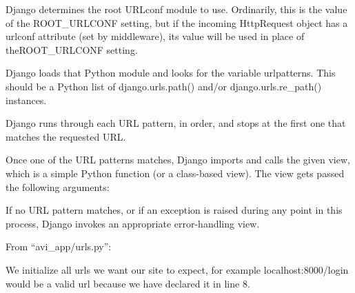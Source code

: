 \documentclass[10pt]{article}
\begin{document}
\begin{description}[font=$\bullet$~\normalfont\scshape\color{red!50!black}]

\item [] Django determines the root URLconf module to use. Ordinarily, this is the value of the ROOT\_URLCONF setting, but if the incoming HttpRequest object has a urlconf attribute (set by middleware), its value will be used in place of theROOT\_URLCONF setting.

\item [] Django loads that Python module and looks for the variable urlpatterns. This should be a Python list of django.urls.path() and/or django.urls.re\_path() instances.

\item [] Django runs through each URL pattern, in order, and stops at the first one that matches the requested URL.

\item [] Once one of the URL patterns matches, Django imports and calls the given view, which is a simple Python function (or a class-based view). The view gets passed the following arguments:

 
 

\item [] If no URL pattern matches, or if an exception is raised during any point in this process, Django invokes an appropriate error-handling view.
\end{description}

From “avi\_app/urls.py”:

We initialize all urls we want our site to expect, for example localhost:8000/login would be a valid url because we have declared it in line 8.
\end{document}
